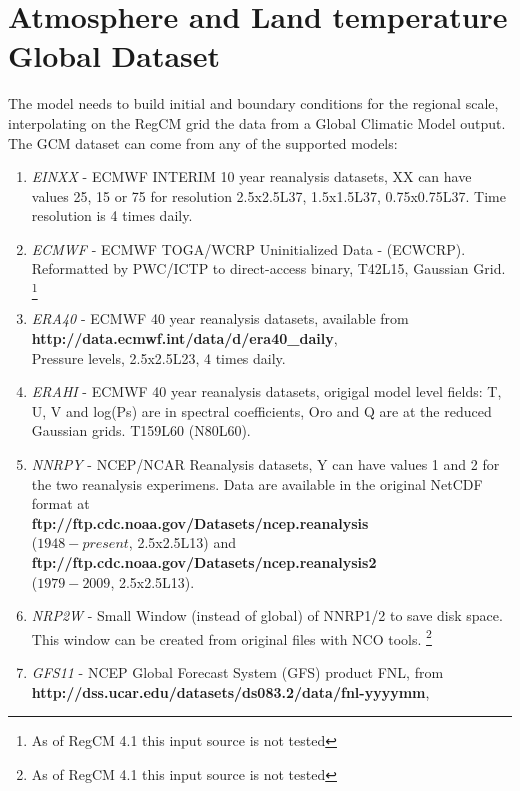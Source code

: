 \section{Atmosphere and Land temperature Global Dataset}

The model needs to build initial and boundary conditions for the regional scale,
interpolating on the RegCM grid the data from a Global Climatic Model output.
The GCM dataset can come from any of the supported models:

\begin{enumerate}
\item {\em EINXX} - ECMWF INTERIM 10 year reanalysis datasets,
XX can have values 25, 15 or 75 for resolution 2.5x2.5L37, 1.5x1.5L37,
0.75x0.75L37. Time resolution is 4 times daily.
\item {\em ECMWF} - ECMWF TOGA/WCRP Uninitialized Data - (ECWCRP).
Reformatted by PWC/ICTP to direct-access binary, T42L15, Gaussian Grid.
\footnote{As of RegCM 4.1 this input source is not tested}
\item {\em ERA40} - ECMWF 40 year reanalysis datasets, available from \\
{\bf http://data.ecmwf.int/data/d/era40\_daily}, \\
Pressure levels, 2.5x2.5L23, 4 times daily.
\item {\em ERAHI} - ECMWF 40 year reanalysis datasets, origigal model level
fields: T, U, V and log(Ps) are in spectral coefficients, Oro and Q are at the
reduced Gaussian grids. T159L60 (N80L60).
\item {\em NNRPY} - NCEP/NCAR Reanalysis datasets, Y can have values 1 and 2
for the two reanalysis experimens. Data are available in the original NetCDF
format at \\ {\bf ftp://ftp.cdc.noaa.gov/Datasets/ncep.reanalysis} \\
($1948 - present$, 2.5x2.5L13) and \\
{\bf ftp://ftp.cdc.noaa.gov/Datasets/ncep.reanalysis2} \\
($1979 - 2009$, 2.5x2.5L13). 
\item {\em NRP2W} - Small Window (instead of global) of NNRP1/2 to save disk
space. This window can be created from original files with NCO tools.
\footnote{As of RegCM 4.1 this input source is not tested}
\item {\em GFS11} - NCEP Global Forecast System (GFS) product FNL, from \\
{\bf http://dss.ucar.edu/datasets/ds083.2/data/fnl-yyyymm}, \\

\end{enumerate}
